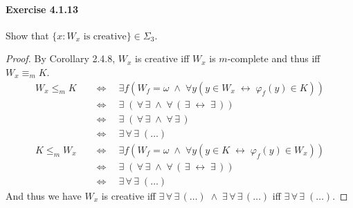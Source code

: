\documentclass[a4paper,11pt]{article}
\begin{document}
\paragraph{Exercise 4.1.13}

Show that $\{ x : W_x \text{ is creative}\} \in \Sigma_3$.
\begin{proof}
By Corollary 2.4.8, $W_x$ is creative iff $W_x$ is $m$-complete and thus iff $W_x \equiv_m K$.
\begin{align*}
  W_x \leq_m K \quad & \Leftrightarrow \quad \exists f(W_f = \omega \; \wedge \; \forall y(y \in W_x \; \leftrightarrow \; \varphi_f(y) \in K))\\
  & \Leftrightarrow \quad \exists \; ( \, \forall \, \exists \; \wedge \; \forall \, ( \, \exists \; \leftrightarrow \; \exists \, ))\\
  & \Leftrightarrow \quad \exists \; ( \, \forall \, \exists \; \wedge \; \forall \, \exists \, )\\
  & \Leftrightarrow \quad \exists \, \forall \, \exists \; (\ldots)
\end{align*}
\begin{align*}
  K \leq_m W_x \quad & \Leftrightarrow \quad \exists f(W_f = \omega \; \wedge \; \forall y(y \in K \; \leftrightarrow \; \varphi_f(y) \in W_x))\\
  & \Leftrightarrow \quad \exists \; ( \, \forall \, \exists \; \wedge \; \forall \, ( \, \exists \; \leftrightarrow \; \exists \, ))\\
  & \Leftrightarrow \quad \exists \, \forall \, \exists \; (\ldots)
\end{align*}
And thus we have $W_x$ is creative iff $\exists \, \forall \, \exists \, (\ldots) \; \wedge \; \exists \, \forall \, \exists \, (\ldots)$ iff $\exists \, \forall \, \exists \; (\ldots)$.
\end{proof}

\end{document}
